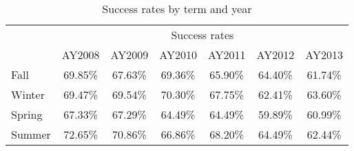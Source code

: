 \begin{table}[!htb]
	\centering
	\caption{Success rates by term and year}
    \label{app:tab:successratesbyterm}
	\begin{tabular}{l*{6}{c}}
		\toprule
		& \multicolumn{6}{c}{Success rates}\\
		\cmidrule{2-7}
		       & AY2008  & AY2009  & AY2010  & AY2011  & AY2012  & AY2013  \\
		\cmidrule{2-7}
		Fall   & 69.85\% & 67.63\% & 69.36\% & 65.90\% & 64.40\% & 61.74\% \\ 
		Winter & 69.47\% & 69.54\% & 70.30\% & 67.75\% & 62.41\% & 63.60\% \\
		Spring & 67.33\% & 67.29\% & 64.49\% & 64.49\% & 59.89\% & 60.99\% \\
		Summer & 72.65\% & 70.86\% & 66.86\% & 68.20\% & 64.49\% & 62.44\% \\
		\bottomrule
	\end{tabular}
\end{table}
